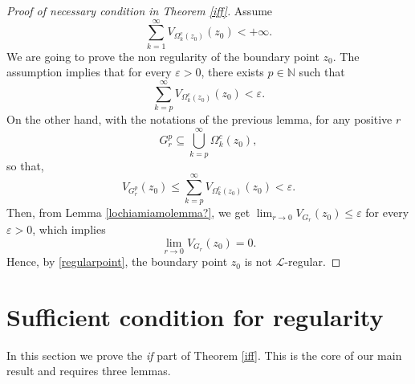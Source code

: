 \documentclass[10pt]{amsart}
\def\elle{\mathcal{L}}
\newcommand{\tende}{\rightarrow}
\newcommand{\ttende}{\longrightarrow}
\newcommand{\enne} {\mathbb{N}}
\numberwithin{equation}{section}
\begin{document}
\begin{proof}[Proof of necessary condition in Theorem \ref{iff}]
Assume
$$\sum_{k=1}^{\infty}{V_{\Omega^c_k(z_0)}(z_0)}<+\infty.$$
We are going to prove the non regularity of the  boundary point $z_0$. The assumption implies that for every $\varepsilon>0$, there exists $p\in \enne$ such that 
\begin{equation*}  \sum_{k=p}^{\infty}{V_{\Omega^c_k(z_0)}(z_0)}<\varepsilon.\end{equation*} 
On the other hand, with the notations of the previous lemma, for any positive $r$
$$G_r^p\subseteq \bigcup_{k=p}^\infty \Omega_k^c(z_0),$$
so that,
$$V_{G_r^p} (z_0) \le \sum_{k=p}^{\infty}{V_{\Omega^c_k(z_0)}(z_0)}<\varepsilon.$$
Then, from Lemma \ref{lochiamiamolemma?}, we get $\lim_{r\tende 0} V_{G_r} (z_0) \le \varepsilon$ for every $\varepsilon>0$, which implies 
$$\lim_{r\ttende 0} V_{G_r}(z_0)= 0.$$  Hence, by \eqref{regularpoint}, the boundary point $z_0$ is not $\elle$-regular.
\end{proof}















\section{Sufficient condition for regularity}\label{cap}
In this section we prove the {\it if} part of Theorem \ref{iff}. This is the core of our main result and requires three lemmas.
\end{document}
